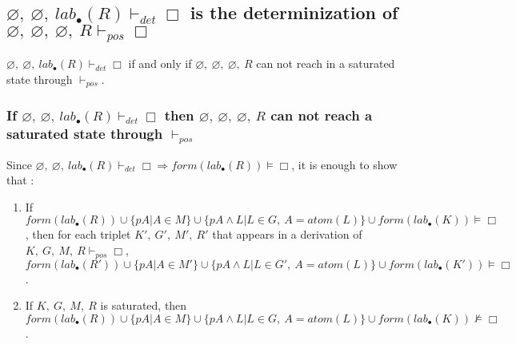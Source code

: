 \documentclass[a4paper,10pt]{article}
\newcommand{\atom}{\mathit{atom}}
\newcommand{\pos}{\vdash_\mathit{pos}}
\newcommand{\dett}{\vdash_\mathit{det}}
\newcommand{\F}{\mathit{form}}
\newcommand{\T}{\mathit{lab}}
\begin{document}
\subsection{$\varnothing,\ \varnothing,\ \T_\bullet(R)\dett\Box$ is the determinization of
$\varnothing,\ \varnothing,\ \varnothing,\ R\pos\Box$}
$\varnothing,\ \varnothing,\ \T_\bullet(R)\dett\Box$ if and only if
$\varnothing,\ \varnothing,\ \varnothing,\ R$ can not reach in a saturated state through $\pos$.

\subsubsection*{If $\varnothing,\ \varnothing,\ \T_\bullet(R)\dett\Box$ then
$\varnothing,\ \varnothing,\ \varnothing,\ R$ can not reach a saturated state through $\pos$}

Since $\varnothing,\ \varnothing,\ \T_\bullet(R)\dett\Box \Rightarrow\F(\T_\bullet(R))\vDash\Box$,
it is enough to show that :
\begin{enumerate}
 \item If $\F(\T_\bullet(R))\cup\{pA|A\in M\}\cup\{pA\wedge L|L\in G,\ A=\atom(L)\}
\cup\F(\T_\bullet(K))\vDash\Box$,
then for each triplet $K',\ G',\ M',\ R'$ that appears in a derivation of $K,\ G,\ M,\ R\pos\Box$,
$\F(\T_\bullet(R'))\cup\{pA|A\in M'\}\cup\{pA\wedge L|L\in G',\ A=\atom(L)\}
\cup\F(\T_\bullet(K'))\vDash\Box$.
 \item If $K,\ G,\ M,\ R$ is saturated, then
$\F(\T_\bullet(R))\cup\{pA|A\in M\}\cup\{pA\wedge L|L\in G,\ A=\atom(L)\}\cup
\F(\T_\bullet(K))\nvDash\Box$.
\end{enumerate}
\end{document}
